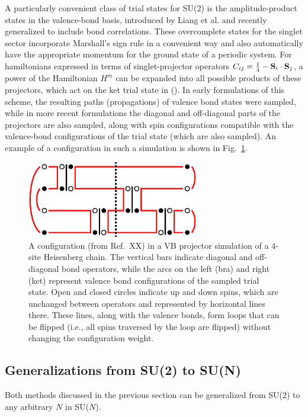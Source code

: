 \documentclass[aps,prb,groupedaddress,twocolumn]{revtex4}
\begin{document}
A particularly convenient class of trial states for SU($2$) is the amplitude-product states in the valence-bond basis, introduced 
by Liang et al. and recently generalized to include bond correlations. These overcomplete states for the singlet sector incorporate
Marshall's sign rule in a convenient way and also automatically have the appropriate momentum for the ground state of a periodic system.
For hamiltonians expressed in terms of singlet-projector operators $C_{ij}=\frac{1}{4}-{\bf S}_i\cdot {\bf S}_j$, a power of the
Hamiltonian $H^m$ can be expanded into all possible products of these projectors, which act on the ket trial state in (). In early
formulations of this scheme, the resulting paths (propagations) of valence bond states were sampled, while in more recent formulations
the diagonal and off-diagonal parts of the projectors are also sampled, along with spin configurations compatible with the valence-bond
configurations of the trial state (which are also sampled). An example of a configuration in such a simulation is shown in Fig.~\ref{loops}.


\begin{figure}
\includegraphics[width=7.5cm, clip]{loops.eps}
\caption{A configuration (from Ref.~XX) in a VB projector simulation of a 4-site Heisenberg chain. The vertical bars 
indicate diagonal and off-diagonal bond operators, while the arcs on the left (bra) and right (ket) represent valence 
bond configurations of the sampled trial state. Open and closed circles indicate up and down spins, which are unchanged between 
operators and represented by horizontal lines there. These lines, along with the valence bonds, form loops that can be flipped
(i.e., all spins traversed by the loop are flipped) without changing the configuration weight.}
\label{loops}
\end{figure}

\subsection {Generalizations from SU(2) to SU(N)}
\label{ss:su2N}

Both methods discussed in the previous section can be generalized from
SU($2$) to any arbitrary $N$ in SU($N$). 
\end{document}
